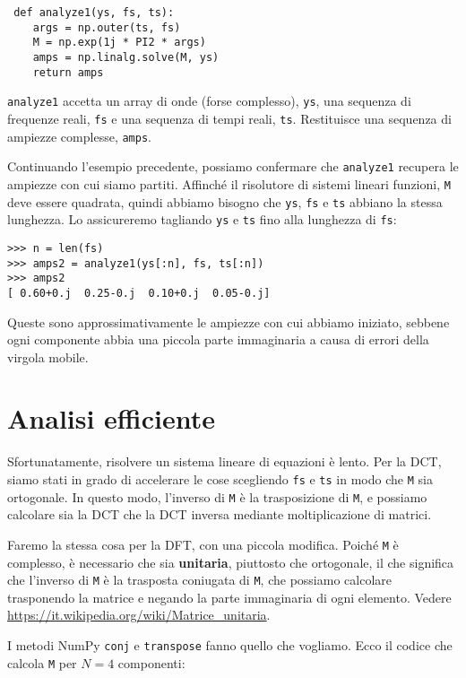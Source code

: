 \documentclass[12pt,a4paper]{book}
\begin{document}
\begin{verbatim} def analyze1(ys, fs, ts):
    args = np.outer(ts, fs)
    M = np.exp(1j * PI2 * args)
    amps = np.linalg.solve(M, ys)
    return amps
 \end{verbatim} 

{\tt analyze1} accetta un array di onde (forse complesso), {\tt ys}, una sequenza di frequenze reali, {\tt fs} e una sequenza di tempi reali, {\tt ts}. Restituisce una sequenza di ampiezze complesse, {\tt amps}.

Continuando l'esempio precedente, possiamo confermare che {\tt analyze1} recupera le ampiezze con cui siamo partiti. Affinché il risolutore di sistemi lineari funzioni, {\tt M} deve essere quadrata, quindi abbiamo bisogno che {\tt ys}, {\tt fs} e {\tt ts} abbiano la stessa lunghezza. Lo assicureremo tagliando {\tt ys} e {\tt ts} fino alla lunghezza di {\tt fs}:

\begin{verbatim} 
>>> n = len(fs)
>>> amps2 = analyze1(ys[:n], fs, ts[:n])
>>> amps2
[ 0.60+0.j  0.25-0.j  0.10+0.j  0.05-0.j]
 \end{verbatim} 

Queste sono approssimativamente le ampiezze con cui abbiamo iniziato, sebbene ogni componente abbia una piccola parte immaginaria a causa di errori della virgola mobile.

\section{Analisi efficiente} 

Sfortunatamente, risolvere un sistema lineare di equazioni è lento. Per la DCT, siamo stati in grado di accelerare le cose scegliendo {\tt fs} e {\tt ts} in modo che {\tt M} sia ortogonale. In questo modo, l'inverso di {\tt M} è la trasposizione di {\tt M}, e possiamo calcolare sia la DCT che la DCT inversa mediante moltiplicazione di matrici.

Faremo la stessa cosa per la DFT, con una piccola modifica. Poiché {\tt M} è complesso, è necessario che sia {\bf unitaria}, piuttosto che ortogonale, il che significa che l'inverso di {\tt M} è la trasposta coniugata di {\tt M}, che possiamo calcolare trasponendo la matrice e negando la parte immaginaria di ogni elemento. Vedere \url{https://it.wikipedia.org/wiki/Matrice_unitaria}.

I metodi NumPy {\tt conj} e {\tt transpose} fanno quello che vogliamo. Ecco il codice che calcola {\tt M} per $N=4$ componenti:
\end{document}
